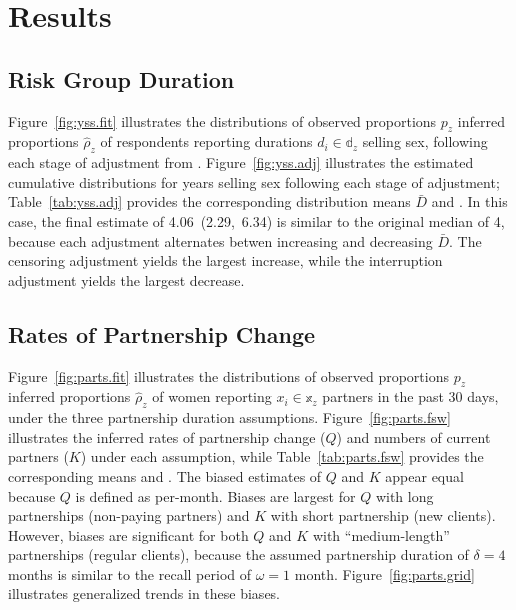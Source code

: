 \section{Results}
\subsection{Risk Group Duration}\label{res.yss}
Figure~\ref{fig:yss.fit} illustrates the distributions of
observed proportions $p_z$ \vs inferred proportions $\hat{\rho}_z$ of respondents
reporting durations $d_i \in \mathbb{d}_z$ selling sex,
following each stage of adjustment from .
Figure~\ref{fig:yss.adj} illustrates
the estimated cumulative distributions for years selling sex following each stage of adjustment;
Table~\ref{tab:yss.adj} provides the corresponding distribution means $\bar{D}$ and \ci.
In this case, the final estimate of 4.06~(2.29,~6.34) is similar to the original median of 4,
because each adjustment alternates betwen increasing and decreasing $\bar{D}$.
The censoring adjustment yields the largest increase, while
the interruption adjustment yields the largest decrease.

\subsection{Rates of Partnership Change}\label{res.parts}
Figure~\ref{fig:parts.fit} illustrates the distributions of
observed proportions $p_z$ \vs inferred proportions $\hat{\rho}_z$ of women
reporting $x_i \in \mathbb{x}_z$ partners in the past 30 days,
under the three partnership duration assumptions.
Figure~\ref{fig:parts.fsw} illustrates the inferred
rates of partnership change ($Q$) and numbers of current partners ($K$) under each assumption,
while Table~\ref{tab:parts.fsw} provides the corresponding means and \ci.
The biased estimates of $Q$ and $K$ appear equal because $Q$ is defined as per-month.
Biases are largest for
$Q$ with long partnerships (\eg non-paying partners) and
$K$ with short partnership (\eg new clients).
However, biases are significant for
both $Q$ and $K$ with ``medium-length'' partnerships (\eg regular clients),
because the assumed partnership duration of $\delta = 4$ months
is similar to the recall period of $\omega = 1$ month.
Figure~\ref{fig:parts.grid} illustrates generalized trends in these biases.


